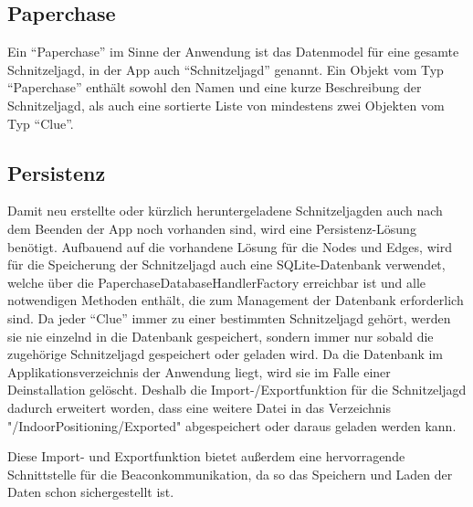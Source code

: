 \subsection{Paperchase}
Ein \enquote{Paperchase} im Sinne der Anwendung ist das Datenmodel für eine gesamte Schnitzeljagd, in der App auch \enquote{Schnitzeljagd} genannt. Ein Objekt vom Typ \enquote{Paperchase} enthält sowohl den Namen und eine kurze Beschreibung der Schnitzeljagd, als auch eine sortierte Liste von mindestens zwei Objekten vom Typ \enquote{Clue}.

\subsection{Persistenz}
Damit neu erstellte oder kürzlich heruntergeladene Schnitzeljagden auch nach dem Beenden der App noch vorhanden sind, wird eine Persistenz-Lösung benötigt. Aufbauend auf die vorhandene Lösung für die Nodes und Edges, wird für die Speicherung der Schnitzeljagd auch eine SQLite-Datenbank verwendet, welche über die PaperchaseDatabaseHandlerFactory erreichbar ist und alle notwendigen Methoden enthält, die zum Management der Datenbank erforderlich sind. Da jeder \enquote{Clue} immer zu einer bestimmten Schnitzeljagd gehört, werden sie nie einzelnd in die Datenbank gespeichert, sondern immer nur sobald die zugehörige Schnitzeljagd gespeichert oder geladen wird.
Da die Datenbank im Applikationsverzeichnis der Anwendung liegt, wird sie im Falle einer Deinstallation gelöscht. Deshalb die Import-/Exportfunktion für die Schnitzeljagd dadurch erweitert worden, dass eine weitere Datei in das Verzeichnis "/IndoorPositioning/Exported" abgespeichert oder daraus geladen werden kann.

Diese Import- und Exportfunktion bietet außerdem eine hervorragende Schnittstelle für die Beaconkommunikation, da so das Speichern und Laden der Daten schon sichergestellt ist.